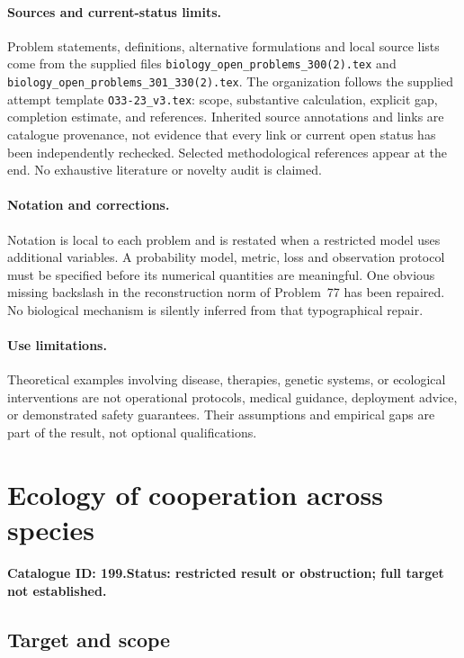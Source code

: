 \documentclass[11pt]{article}
\begin{document}
\paragraph{Sources and current-status limits.}
Problem statements, definitions, alternative formulations and local source lists
come from the supplied files
\texttt{biology\_open\_problems\_300(2).tex} and
\texttt{biology\_open\_problems\_301\_330(2).tex}.
The organization follows the supplied attempt template
\texttt{O33-23\_v3.tex}: scope, substantive calculation, explicit gap,
completion estimate, and references. Inherited source annotations and links are
catalogue provenance, not evidence that every link or current open status has
been independently rechecked. Selected methodological references appear at the
end. No exhaustive literature or novelty audit is claimed.

\paragraph{Notation and corrections.}
Notation is local to each problem and is restated when a restricted model uses
additional variables. A probability model, metric, loss and observation protocol
must be specified before its numerical quantities are meaningful. One obvious
missing backslash in the reconstruction norm of Problem~77 has been repaired.
No biological mechanism is silently inferred from that typographical repair.

\paragraph{Use limitations.}
Theoretical examples involving disease, therapies, genetic systems, or ecological
interventions are not operational protocols, medical guidance, deployment advice,
or demonstrated safety guarantees. Their assumptions and empirical gaps are part
of the result, not optional qualifications.

\setcounter{section}{198}
\section{Ecology of cooperation across species}
\label{prob:199}
\noindent\textbf{Catalogue ID: 199.}\quad \textbf{Status: restricted result or obstruction; full target not established.}
\subsection{Target and scope}
\end{document}
